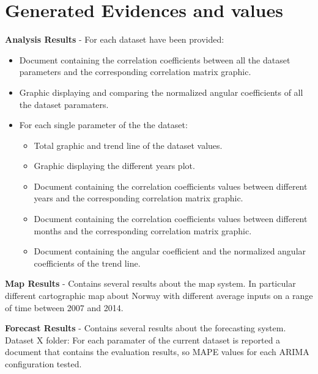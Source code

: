 \section{Generated Evidences and values}
\textbf{Analysis Results} - For each dataset have been provided:
\vspace{-5mm}
\begin{itemize}
 \item Document containing the correlation coefficients between all the dataset parameters and the corresponding correlation matrix graphic.
 \item Graphic displaying and comparing the normalized angular coefficients of all the dataset paramaters.
 \item For each single parameter of the the dataset:
\begin{itemize}
\item Total graphic and trend line of the dataset values.
\item Graphic displaying the different years plot.
\item Document containing the correlation coefficients values between different years and the corresponding correlation matrix graphic.
\item Document containing the correlation coefficients values between different months and the corresponding correlation matrix graphic.
\item Document containing the angular coefficient and the normalized angular coefficients of the trend line.
\end{itemize}
\end{itemize}

\textbf{Map Results} - Contains several results about the map system. In particular different cartographic map about Norway with different average inputs on a range of time between 2007 and 2014.

\textbf{Forecast Results} - Contains several results about the forecasting system.
Dataset X folder: 
	For each paramater of the current dataset is reported a document that contains the evaluation results, so MAPE values for each ARIMA 	configuration tested.
		

